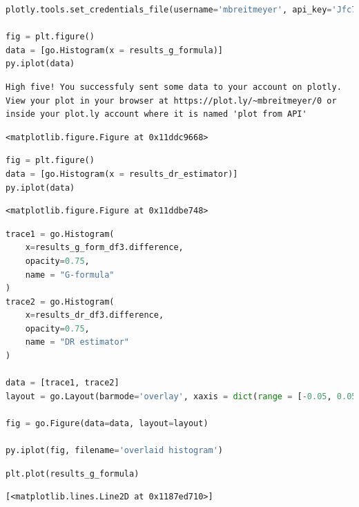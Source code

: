 \begin{lstlisting}[language=Python]
plotly.tools.set_credentials_file(username='mbreitmeyer', api_key='Jfc79CurOmlfLyFufhnP')

fig = plt.figure()
data = [go.Histogram(x = results_g_formula)]
py.iplot(data)
\end{lstlisting}

\begin{lstlisting}
High five! You successfuly sent some data to your account on plotly. View your plot in your browser at https://plot.ly/~mbreitmeyer/0 or inside your plot.ly account where it is named 'plot from API'
\end{lstlisting}

\begin{lstlisting}
<matplotlib.figure.Figure at 0x11ddc9668>
\end{lstlisting}

\begin{lstlisting}[language=Python]
fig = plt.figure()
data = [go.Histogram(x = results_dr_estimator)]
py.iplot(data)
\end{lstlisting}

\begin{lstlisting}
<matplotlib.figure.Figure at 0x11ddbe748>
\end{lstlisting}

\begin{lstlisting}[language=Python]
trace1 = go.Histogram(
    x=results_g_form_df3.difference,
    opacity=0.75, 
    name = "G-formula"
)
trace2 = go.Histogram(
    x=results_dr_df3.difference,
    opacity=0.75, 
    name = "DR estimator"
)

data = [trace1, trace2]
layout = go.Layout(barmode='overlay', xaxis = dict(range = [-0.05, 0.05]))

fig = go.Figure(data=data, layout=layout)

py.iplot(fig, filename='overlaid histogram')
\end{lstlisting}

\begin{lstlisting}[language=Python]
plt.plot(results_g_formula)
\end{lstlisting}

\begin{lstlisting}
[<matplotlib.lines.Line2D at 0x1187ed710>]
\end{lstlisting}

